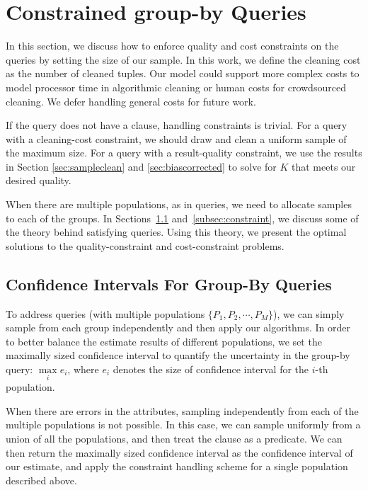 \section{Constrained group-by Queries}\label{sec:query-processing}
In this section, we discuss how to enforce quality and cost constraints on the queries by setting the size of our sample.
In this work, we define the cleaning cost as the number of cleaned tuples.
Our model could support more complex costs to model processor time in algorithmic cleaning or human costs for crowdsourced cleaning.
We defer handling general costs for future work.

If the query does not have a \groupby clause, handling constraints is trivial.
For a query with a cleaning-cost constraint, we should draw and clean a uniform sample of the maximum size.
For a query with a result-quality constraint, we use the results in Section \ref{sec:sampleclean} and \ref{sec:biascorrected} to solve for $K$ that meets our desired quality.


When there are multiple populations, as in \groupby queries, we need to allocate samples to each of the groups.
In Sections~\ref{sec:group-by} and~\ref{subsec:constraint}, we discuss some of the theory behind satisfying \groupby queries.
Using this theory, we present the optimal solutions to the quality-constraint and cost-constraint problems.

\subsection{Confidence Intervals For Group-By Queries}\label{sec:group-by}
To address \groupby queries (with multiple populations $\{P_1, P_2,\cdots, P_M\}$), we can simply sample from each group independently and then apply our algorithms.
In order to better balance the estimate results of different populations, we set the maximally sized confidence interval to quantify the uncertainty in the group-by query: $\max\limits_i e_i$,
where $e_i$ denotes the size of confidence interval for the $i$-th population.

When there are errors in the \groupby attributes, sampling independently from each of the multiple populations is not possible.
In this case, we can sample uniformly from a union of all the populations, and then treat the \groupby clause as a predicate.
We can then return the maximally sized confidence interval as the confidence interval of our estimate, and apply the constraint handling scheme for a single population described above.

